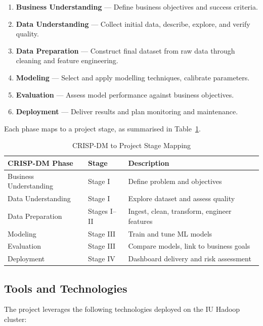 \begin{enumerate}
    \item \textbf{Business Understanding} — Define business objectives and success criteria.
    \item \textbf{Data Understanding} — Collect initial data, describe, explore, and verify quality.
    \item \textbf{Data Preparation} — Construct final dataset from raw data through cleaning and feature engineering.
    \item \textbf{Modeling} — Select and apply modelling techniques, calibrate parameters.
    \item \textbf{Evaluation} — Assess model performance against business objectives.
    \item \textbf{Deployment} — Deliver results and plan monitoring and maintenance.
\end{enumerate}

Each phase maps to a project stage, as summarised in Table~\ref{tab:crispdm-mapping}.

\begin{table}[H]
\centering
\caption{CRISP-DM to Project Stage Mapping}
\label{tab:crispdm-mapping}
\begin{tabular}{lll}
\toprule
\textbf{CRISP-DM Phase} & \textbf{Stage} & \textbf{Description} \\
\midrule
Business Understanding & Stage I & Define problem and objectives \\
Data Understanding & Stage I & Explore dataset and assess quality \\
Data Preparation & Stages I--II & Ingest, clean, transform, engineer features \\
Modeling & Stage III & Train and tune ML models \\
Evaluation & Stage III & Compare models, link to business goals \\
Deployment & Stage IV & Dashboard delivery and risk assessment \\
\bottomrule
\end{tabular}
\end{table}

\subsection{Tools and Technologies}

The project leverages the following technologies deployed on the IU Hadoop cluster:

